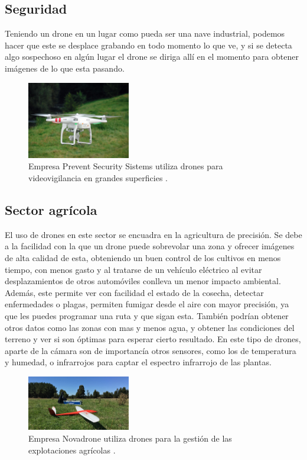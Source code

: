 	\subsection{Seguridad} Teniendo un drone en un lugar como pueda ser una nave industrial, podemos hacer que este se desplace grabando en todo momento lo que ve, y si se detecta algo sospechoso en alg\'un lugar el drone se diriga all\'i en el momento para obtener im\'agenes de lo que esta pasando. 

\begin{figure}[H]
	\centering
		\includegraphics[width=0.4\textwidth]{imgs/seguridad_drone.jpg}
		\caption{Empresa Prevent Security Sistems utiliza drones para videovigilancia en grandes superficies .}
	\label{fig: Empresa Prevent Security Sistems realiza videovigilancia con drones.}
\end{figure}

	\subsection{Sector agr\'icola} El uso de drones en este sector se encuadra en la agricultura de precisi\'on. Se debe a la facilidad con la que un drone puede sobrevolar una zona y ofrecer im\'agenes de alta calidad de esta, obteniendo un buen control de los cultivos en menos tiempo, con menos gasto y al tratarse de un veh\'iculo el\'ectrico al evitar desplazamientos de otros autom\'oviles conlleva un menor impacto ambiental. Adem\'as, este permite ver con facilidad el estado de la cosecha, detectar enfermedades o plagas, permiten fumigar desde el aire con mayor precisi\'on, ya que les puedes programar una ruta y que sigan esta. Tambi\'en podr\'ian obtener otros datos como las zonas con mas y menos agua, y obtener las condiciones del terreno y ver si son \'optimas para esperar cierto resultado. En este tipo de drones, aparte de la c\'amara son de importanc\'ia otros sensores, como los de temperatura y humedad, o infrarrojos para captar el espectro infrarrojo de las plantas. 
	
	
\begin{figure}[H]
	\centering
		\includegraphics[width=0.4\textwidth]{imgs/novadrone.jpg}
		\caption{Empresa Novadrone utiliza drones para la gesti\'on de las explotaciones agr\'icolas .}
	\label{fig: Empresa Novadrone, aplicaciones en agricultura.}
\end{figure}

